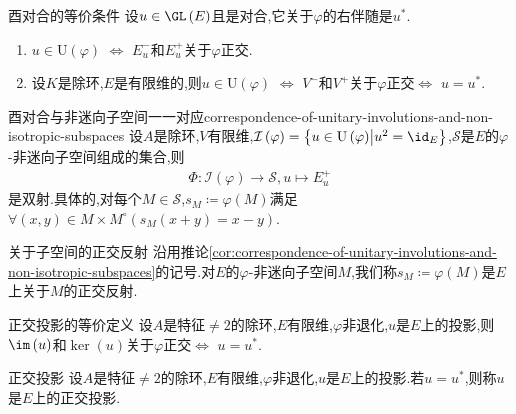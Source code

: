\begin{proposition}{酉对合的等价条件}{}
	设$u\in\GL\left(E\right)$且是对合,它关于$\varphi$的右伴随是$u^{\ast}$.
	\begin{enumerate}
		\item $u\in\mathrm{U}\left(\varphi\right)$ $\iff$ $E_{u}^{-}$和$E_{u}^{+}$关于$\varphi$正交.
		\item 设$K$是除环,$E$是有限维的,则$u\in\mathrm{U}\left(\varphi\right)$ $\iff$ $V^{-}$和$V^{+}$关于$\varphi$正交$\iff$ $u=u^{\ast}$.
	\end{enumerate}
\end{proposition}

\begin{corollary}{酉对合与非迷向子空间一一对应}{correspondence-of-unitary-involutions-and-non-isotropic-subspaces}
	设$A$是除环,$V$有限维,$\mathcal{I}\left(\varphi\right)=\left\{u\in\mathrm{U}\left(\varphi\right)\middle|u^{2}=\id_{E}\right\}$,$\mathcal{S}$是$E$的$\varphi$-非迷向子空间组成的集合,则
	\begin{align*}
		\Phi:\mathcal{I}\left(\varphi\right)\to\mathcal{S},u\mapsto E_{u}^{+}
	\end{align*}
	是双射.具体的,对每个$M\in\mathcal{S}$,$s_{M}\coloneq\varphi\left(M\right)$满足$\forall\left(x,y\right)\in M\times M^{\circ}\left(s_{M}\left(x+y\right)=x-y\right)$.
\end{corollary}

\begin{definition}{关于子空间的正交反射}{}
	沿用推论\ref{cor:correspondence-of-unitary-involutions-and-non-isotropic-subspaces}的记号.对$E$的$\varphi$-非迷向子空间$M$,我们称$s_{M}\coloneq\varphi\left(M\right)$是$E$上关于$M$的正交反射.
\end{definition}

\begin{corollary}{正交投影的等价定义}{}
	设$A$是特征$\neq 2$的除环,$E$有限维,$\varphi$非退化,$u$是$E$上的投影,则$\im\left(u\right)$和$\ker\left(u\right)$关于$\varphi$正交$\iff$ $u=u^{\ast}$.
\end{corollary}

\begin{definition}{正交投影}{}
	设$A$是特征$\neq 2$的除环,$E$有限维,$\varphi$非退化,$u$是$E$上的投影.若$u=u^{\ast}$,则称$u$是$E$上的正交投影.
\end{definition}